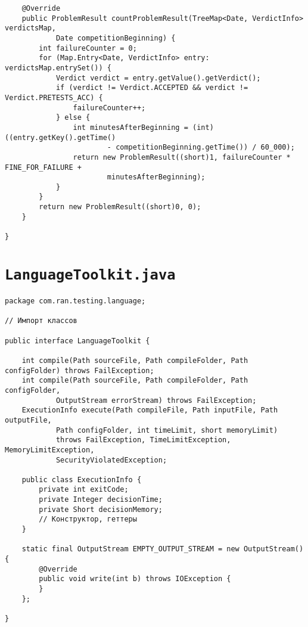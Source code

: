 \begin{verbatim}
    @Override
    public ProblemResult countProblemResult(TreeMap<Date, VerdictInfo> verdictsMap,
            Date competitionBeginning) {
        int failureCounter = 0;
        for (Map.Entry<Date, VerdictInfo> entry: verdictsMap.entrySet()) {
            Verdict verdict = entry.getValue().getVerdict();
            if (verdict != Verdict.ACCEPTED && verdict != Verdict.PRETESTS_ACC) {
                failureCounter++;
            } else {
                int minutesAfterBeginning = (int)((entry.getKey().getTime()
                        - competitionBeginning.getTime()) / 60_000);
                return new ProblemResult((short)1, failureCounter * FINE_FOR_FAILURE +
                        minutesAfterBeginning);
            }
        }
        return new ProblemResult((short)0, 0);
    }

}
\end{verbatim}

\section*{\texttt{LanguageToolkit.java}}
\begin{verbatim}
package com.ran.testing.language;

// Импорт классов

public interface LanguageToolkit {
    
    int compile(Path sourceFile, Path compileFolder, Path configFolder) throws FailException;
    int compile(Path sourceFile, Path compileFolder, Path configFolder,
            OutputStream errorStream) throws FailException;
    ExecutionInfo execute(Path compileFile, Path inputFile, Path outputFile,
            Path configFolder, int timeLimit, short memoryLimit)
            throws FailException, TimeLimitException, MemoryLimitException,
            SecurityViolatedException;

    public class ExecutionInfo {
        private int exitCode;
        private Integer decisionTime;
        private Short decisionMemory;
        // Конструктор, геттеры
    }
    
    static final OutputStream EMPTY_OUTPUT_STREAM = new OutputStream() {
        @Override
        public void write(int b) throws IOException {
        }
    };
    
}
\end{verbatim}

